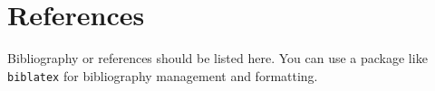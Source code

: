 \section{References}
Bibliography or references should be listed here. You can use a package like \texttt{biblatex} for bibliography management and formatting.